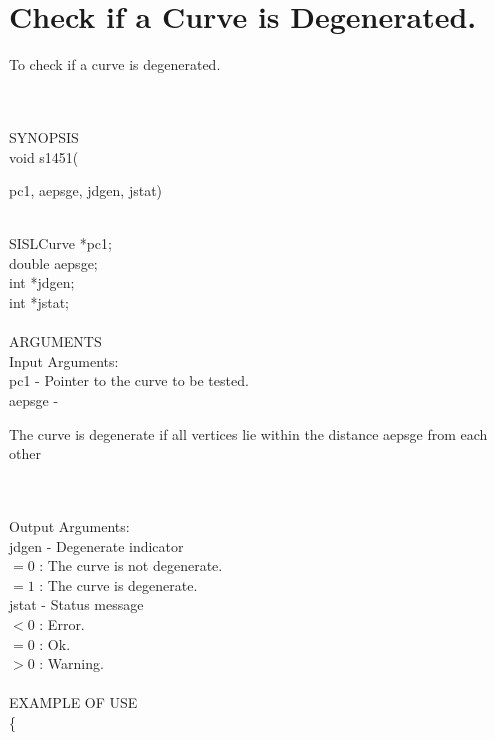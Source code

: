 \section{Check if a Curve is Degenerated.}
\begin{minipg1}
  To check if a curve is degenerated.
\end{minipg1} \\ \\
SYNOPSIS\\
        \> void s1451(\begin{minipg3}
          {\fov pc1}, {\fov aepsge}, {\fov jdgen}, {\fov jstat})
        \end{minipg3}\\[0.3ex]
        \>\>    SISLCurve \> *{\fov pc1};\\
        \>\>    double    \> {\fov aepsge};\\
        \>\>    int       \> *{\fov jdgen};\\
        \>\>    int       \> *{\fov jstat};\\
\\
ARGUMENTS\\
        \>Input Arguments:\\
        \>\>    {\fov pc1}    \> - \> Pointer to the curve to be tested.\\
        \>\>    {\fov aepsge} \> - \>
        \begin{minipg2}
          The curve is degenerate if all vertices lie
          within the distance aepsge from each other
        \end{minipg2}\\[0.8ex]
\\
        \>Output Arguments:\\
        \>\>    {\fov jdgen}  \> - \> Degenerate indicator\\
                \>\>\>\>\> $= 0$ : The curve is not degenerate.\\
                \>\>\>\>\> $= 1$ : The curve is degenerate.\\
        \>\>    {\fov jstat}  \> - \> Status message\\
                \>\>\>\>\> $< 0$ : Error.\\
                \>\>\>\>\> $= 0$ : Ok.\\
                \>\>\>\>\> $> 0$ : Warning.\\
\\
EXAMPLE OF USE\\
        \>      \{ \\
